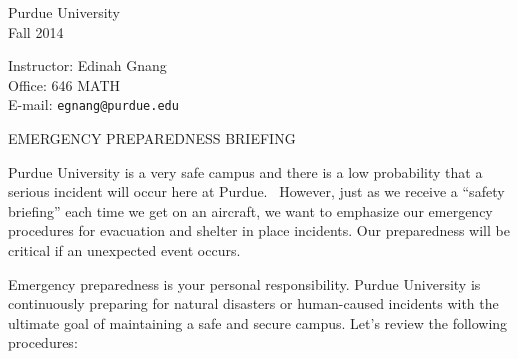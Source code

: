 \documentclass[10pt]{article}
\begin{document}
\noindent\parbox{7cm}{\large Purdue University\\
                    Fall 2014}
\hfill
\parbox{7cm}{\large Instructor: Edinah Gnang\\
                    Office: 646 MATH\\
                    E-mail: {\tt egnang@purdue.edu}}

 
\begin{center}                   EMERGENCY PREPAREDNESS BRIEFING
\end{center}
Purdue University is a very safe campus and there
is a low probability that a serious incident will occur here at Purdue. 
However, just as we receive a “safety briefing” each time we get on an
aircraft, we want to emphasize our emergency procedures for evacuation and
shelter in place incidents. Our preparedness will be critical if an
unexpected event occurs.

Emergency preparedness is your personal responsibility. Purdue University
is continuously preparing for natural disasters or human-caused incidents
with the ultimate goal of maintaining a safe and secure campus. Let’s
review the following procedures:
\end{document}
